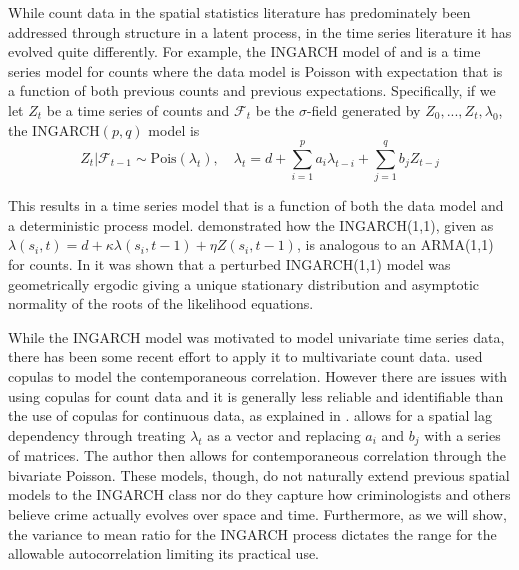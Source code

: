 \documentclass[11pt]{isuthesis}
\begin{document}
While count data in the spatial statistics literature has predominately been addressed through structure in a latent process, in the time series literature it has evolved quite differently.  For example, the INGARCH model of \cite{ferland2006integer} and \cite{heinen2003modelling} is a time series model for counts where the data model is Poisson with expectation that is a function of both previous counts and previous expectations.  Specifically, if we let ${Z_t}$ be a time series of counts and $\mathcal{F}_t$ be the $\sigma$-field generated by ${Z_0,...,Z_t,\lambda_0}$, the INGARCH$(p,q)$ model is
\begin{equation}
	Z_t|\mathcal{F}_{t-1}\sim \mbox{Pois}(\lambda_t),\quad \lambda_t=d + \sum_{i=1}^p a_i \lambda_{t-i}+\sum_{j=1}^q b_j Z_{t-j}\label{eq:INGARCH}
\end{equation}

This results in a time series model that is a function of both the data model and a deterministic process model.  \cite{ferland2006integer} demonstrated how the INGARCH(1,1), given as $\lambda(s_i,t)=d+\kappa \lambda(s_i,t-1)+\eta Z(s_i,t-1)$, is analogous to an ARMA(1,1) for counts.  In \cite{fokianos2009poisson} it was shown that a perturbed INGARCH(1,1) model was geometrically ergodic giving a unique stationary distribution and asymptotic normality of the roots of the likelihood equations.

While the INGARCH model was motivated to model univariate time series data, there has been some recent effort to apply it to multivariate count data.  \cite{heinen2007multivariate} used copulas to model the contemporaneous correlation.  However there are issues with using copulas for count data and it is generally less reliable and identifiable than the use of copulas for continuous data, as explained in \cite{genest2007primer}.  \cite{liu2012some} allows for a spatial lag dependency through treating $\lambda_t$ as a vector and replacing $a_i$ and $b_j$ with a series of matrices.  The author then allows for contemporaneous correlation through the bivariate Poisson.  These models, though, do not naturally extend previous spatial models to the INGARCH class nor do they capture how criminologists and others believe crime actually evolves over space and time.  Furthermore, as we will show, the variance to mean ratio for the INGARCH process dictates the range for the allowable autocorrelation limiting its practical use.
\end{document}
